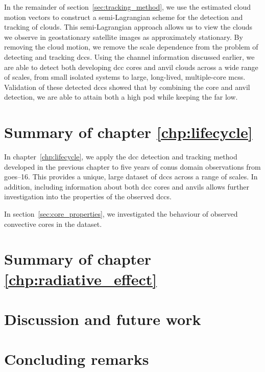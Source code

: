 In the remainder of section~\ref{sec:tracking_method}, we use the estimated cloud motion vectors to construct a semi-Lagrangian scheme for the detection and tracking of clouds.
This semi-Lagrangian approach allows us to view the clouds we observe in geostationary satellite images as approximately stationary.
By removing the cloud motion, we remove the scale dependence from the problem of detecting and tracking \acrshort{dcc}s.
Using the channel information discussed earlier, we are able to detect both developing \acrshort{dcc} cores and anvil clouds across a wide range of scales, from small isolated systems to large, long-lived, multiple-core \acrshort{mcs}s.
Validation of these detected \acrshort{dcc}s showed that by combining the core and anvil detection, we are able to attain both a high \acrshort{pod} while keeping the \acrshort{far} low.

\section{Summary of chapter \ref{chp:lifecycle}}

In chapter~\ref{chp:lifecycle}, we apply the \acrshort{dcc} detection and tracking method developed in the previous chapter to five years of \acrshort{conus} domain observations from \acrshort{goes}--16.
This provides a unique, large dataset of \acrshort{dcc}s across a range of scales.
In addition, including information about both \acrshort{dcc} cores and anvils allows further investigation into the properties of the observed \acrshort{dcc}s.

In section~\ref{sec:core_properties}, we investigated the behaviour of observed convective cores in the dataset.





\section{Summary of chapter \ref{chp:radiative_effect}}




\section{Discussion and future work}




\section{Concluding remarks}